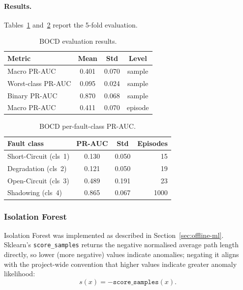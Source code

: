 \paragraph{Results.}
Tables~\ref{tab:bocd-results} and~\ref{tab:bocd-per-class} report the 5-fold evaluation.

\begin{table}[H]
\centering
\caption{BOCD evaluation results.\label{tab:bocd-results}}
\begin{tabular}{lccc}
\toprule
\textbf{Metric} & \textbf{Mean} & \textbf{Std} & \textbf{Level} \\
\midrule
Macro PR-AUC & 0.401 & 0.070 & sample \\
Worst-class PR-AUC     & 0.095 & 0.024 & sample \\
Binary PR-AUC          & 0.870 & 0.068 & sample \\
Macro PR-AUC & 0.411 & 0.070 & episode \\
\bottomrule
\end{tabular}
\end{table}

\begin{table}[H]
\centering
\caption{BOCD per-fault-class PR-AUC.\label{tab:bocd-per-class}}
\begin{tabular}{lccr}
\toprule
\textbf{Fault class} & \textbf{PR-AUC} & \textbf{Std} & \textbf{Episodes} \\
\midrule
Short-Circuit (cls~1) & 0.130 & 0.050 & 15 \\
Degradation   (cls~2) & 0.121 & 0.050 & 19 \\
Open-Circuit  (cls~3) & 0.489 & 0.191 & 23 \\
Shadowing     (cls~4) & 0.865 & 0.067 & 1000 \\
\bottomrule
\end{tabular}
\end{table}

\subsubsection{Isolation Forest}

Isolation Forest was implemented as described in Section~\ref{sec:offline-ml}. Sklearn's \texttt{score\_samples} returns the negative normalised average path length directly, so lower (more negative) values indicate anomalies; negating it aligns with the project-wide convention that higher values indicate greater anomaly likelihood:
\begin{equation}
    s(x) = -\texttt{score\_samples}(x).
\end{equation}

